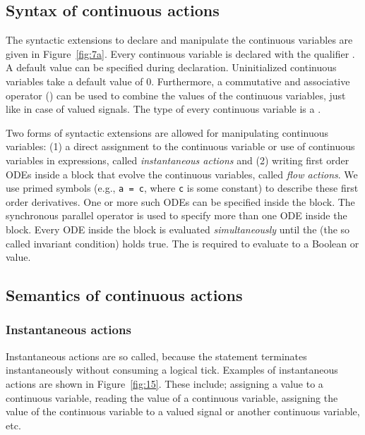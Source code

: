 \documentclass[10pt,journal,cspaper,compsoc]{IEEEtran}
\begin{document}
\subsection{Syntax of continuous actions}
\label{sec:synt-cont-acti}

The syntactic extensions to declare and manipulate the continuous
variables are given in Figure~\ref{fig:7a}. Every continuous variable is
declared with the qualifier . A default value can be
specified during declaration. Uninitialized continuous variables take a
default value of 0. Furthermore, a commutative and associative operator
() can be used to combine the values of the continuous variables,
just like in case of valued signals. The type of every continuous
variable is a .

Two forms of syntactic extensions are allowed for manipulating
continuous variables: (1) a direct assignment to the continuous variable
or use of continuous variables in expressions, called
\textit{instantaneous actions} and (2) writing first order ODEs inside a
 block that evolve the continuous
variables, called \textit{flow actions}. We use primed symbols (e.g.,
\mbox{\texttt{a = c}}, where \texttt{c} is some constant) to describe
these first order derivatives. One or more such ODEs can be specified
inside the  block. The synchronous parallel operator 
is used to specify more than one ODE inside the 
block. Every ODE inside the  block is evaluated
\textit{simultaneously} until the  (the so called invariant
condition) holds true. The   is required to
evaluate to a Boolean  or  value.

\subsection{Semantics of continuous actions}
\label{sec:semant-cont-acti}



\subsubsection{Instantaneous actions}
\label{sec:inst-acti}

Instantaneous actions are so called, because the statement terminates
instantaneously without consuming a logical tick. Examples of
instantaneous actions are shown in Figure~\ref{fig:15}. These include;
assigning a value to a continuous variable, reading the value of a
continuous variable, assigning the value of the continuous variable to a
valued signal or another continuous variable, etc.
\end{document}
